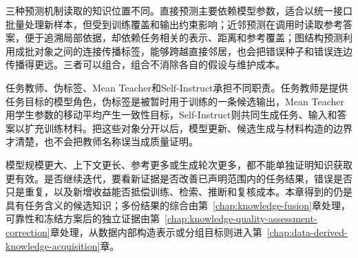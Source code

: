三种预测机制读取的知识位置不同。直接预测主要依赖模型参数，适合以统一接口批量处理新样本，但受到训练覆盖和输出约束影响；近邻预测在调用时读取参考答案，便于追溯局部依据，却依赖任务相关的表示、距离和参考覆盖；图结构预测利用成批对象之间的连接传播标签，能够跨越直接邻居，也会把错误种子和错误连边传播得更远。三者可以组合，组合不消除各自的假设与维护成本。

任务教师、伪标签、Mean Teacher和Self-Instruct承担不同职责。任务教师是提供任务目标的模型角色，伪标签是被暂时用于训练的一条候选输出，Mean Teacher用学生参数的移动平均产生一致性目标，Self-Instruct则共同生成任务、输入和答案以扩充训练材料。把这些对象分开以后，模型更新、候选生成与材料构造的边界才清楚，也不会把教师名称误当成质量证明。

模型规模更大、上下文更长、参考更多或生成轮次更多，都不能单独证明知识获取更有效。是否继续迭代，要看新证据是否改善已声明范围内的任务结果，错误是否只是重复，以及新增收益能否抵偿训练、检索、推断和复核成本。本章得到的仍是具有任务含义的候选知识；多份结果的综合由第~\ref{chap:knowledge-fusion}章处理，可靠性和冻结方案后的独立证据由第~\ref{chap:knowledge-quality-assessment-correction}章处理，从数据内部构造表示或分组目标则进入第~\ref{chap:data-derived-knowledge-acquisition}章。
